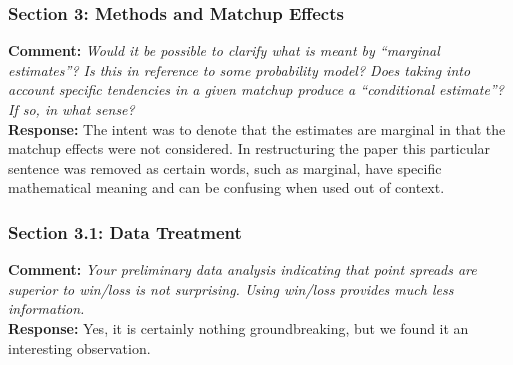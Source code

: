 \documentclass[11pt]{article} %
\begin{document}
\subsubsection*{Section 3: Methods and Matchup Effects}
{\bf Comment:} \emph{Would it be possible to clarify what is meant by ``marginal estimates''? Is this in reference to some probability model? Does taking into account specific tendencies in a given matchup produce a ``conditional estimate''? If so, in what sense?\\}
{\bf Response:} The intent was to denote that the estimates are marginal in that the matchup effects were not considered. In restructuring the paper this particular sentence was removed as certain words, such as marginal, have specific mathematical meaning and can be confusing when used out of context.\\

\subsubsection*{Section 3.1: Data Treatment}
{\bf Comment:} \emph{Your preliminary data analysis indicating that point spreads are superior to win/loss is not surprising. Using win/loss provides much less information.\\}
{\bf Response:} Yes, it is certainly nothing groundbreaking, but we found it an interesting observation.\\
\end{document}
